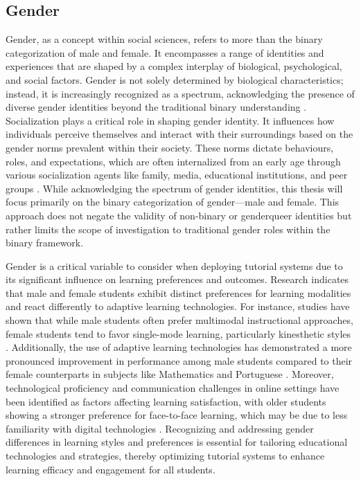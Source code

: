 \subsection{Gender}
Gender, as a concept within social sciences, refers to more than the binary categorization of male and female.
It encompasses a range of identities and experiences that are shaped by a complex interplay of biological, psychological, and social factors.
Gender is not solely determined by biological characteristics; instead, it is increasingly recognized as a spectrum, acknowledging the presence of diverse gender identities beyond the traditional binary understanding \parencite{lindqvistWhatGenderAnyway2021}.
Socialization plays a critical role in shaping gender identity. It influences how individuals perceive themselves and interact with their surroundings based on the gender norms prevalent within their society.
These norms dictate behaviours, roles, and expectations, which are often internalized from an early age through various socialization agents like family, media, educational institutions, and peer groups \parencite{kampshoffHandbuchGeschlechterforschungUnd2012}.
While acknowledging the spectrum of gender identities, this thesis will focus primarily on the binary categorization of gender—male and female.
This approach does not negate the validity of non-binary or genderqueer identities but rather limits the scope of investigation to traditional gender roles within the binary framework.

Gender is a critical variable to consider when deploying tutorial systems due to its significant influence on learning preferences and outcomes.
Research indicates that male and female students exhibit distinct preferences for learning modalities and react differently to adaptive learning technologies.
For instance, studies have shown that while male students often prefer multimodal instructional approaches, female students tend to favor single-mode learning, particularly kinesthetic styles \parencite{wehrweinGenderDifferencesLearning2007}.
Additionally, the use of adaptive learning technologies has demonstrated a more pronounced improvement in performance among male students compared to their female counterparts in subjects like Mathematics and Portuguese \parencite{desantanaEvaluatingImpactMars2016}.
Moreover, technological proficiency and communication challenges in online settings have been identified as factors affecting learning satisfaction, with older students showing a stronger preference for face-to-face learning, which may be due to less familiarity with digital technologies \parencite{dabajRoleGenderAge2009}.
Recognizing and addressing gender differences in learning styles and preferences is essential for tailoring educational technologies and strategies, thereby optimizing tutorial systems to enhance learning efficacy and engagement for all students.

